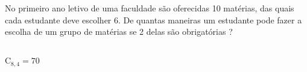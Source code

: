 \begin{ex}
No primeiro ano letivo de uma faculdade são oferecidas 10 matérias, das quais cada estudante deve escolher 6. De quantas maneiras um estudante pode fazer a escolha de um grupo de matérias se 2 delas são obrigatórias ?
  \begin{sol}
   \phantom{A} \\
   $\mathrm{C}_{8,4}=70$
  \end{sol}
\end{ex}
